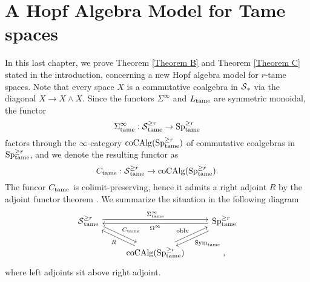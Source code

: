 \chapter{A Hopf Algebra Model for Tame spaces}

In this last chapter, we prove Theorem \ref{Theorem B} and Theorem \ref{Theorem C} stated in the introduction,
concerning a new Hopf algebra model for $r$-tame spaces. Note that every space $X$ is a commutative coalgebra in $\operatorname{\mathcal{S}}_*$ via the diagonal $X\to X\wedge X$. Since the functors $\Sigma^{\infty}$ and $L_{\operatorname{\operatorname{tame}}}$ are symmetric monoidal, the functor
$$
\Sigma^{\infty}_{\operatorname{\operatorname{tame}}}: \operatorname{\mathcal{S}}^{\geq r}_{\operatorname{\operatorname{tame}}}  \to \operatorname{Sp}^{\geq r}_{\operatorname{\operatorname{tame}}}
$$
factors through the $\infty$-category $\operatorname{coCAlg}(\operatorname{Sp}^{\geq r}_{\operatorname{\operatorname{tame}}})$ of commutative coalgebras in $\operatorname{Sp}^{\geq r}_{\operatorname{\operatorname{tame}}}$, and we denote the resulting functor as
$$
C_{\operatorname{\operatorname{tame}}}:  \operatorname{\mathcal{S}}^{\geq r}_{\operatorname{\operatorname{tame}}}
\to 
\operatorname{coCAlg}(\operatorname{Sp}^{\geq r}_{\operatorname{\operatorname{tame}}}).
$$
The funcor $C_{\operatorname{\operatorname{tame}}}$ is colimit-preserving, hence it admits a right adjoint $R$ by the adjoint functor theorem \cite[Corollary 5.5.2.9.]{HTT}. 
We summarize the situation in the following diagram
\[
\begin{tikzcd}
	\Space^{\geq r}_{\tame} &   & \Sp^{\geq r}_{\tame} \\
	&  \coCAlg(\Sp^{\geq r}_{\tame}) &
	\arrow[from=1-1, to = 1-3, "\Sigma^{\infty}_{\tame}", shift left]
	\arrow[from=1-3, to = 1-1, "\Omega^{\infty}", shift left]
	\arrow[from=1-1 , to =2-2, "C_{\tame}", shift left]
	\arrow[from=2-2 , to =1-1, "R", shift left]
	\arrow[from=2-2, to=1-3, "\oblv", shift left]
	\arrow[from=1-3, to=2-2, "\Sym_{\tame}", shift left],
\end{tikzcd}
\]
where left adjoints sit above right adjoint.

